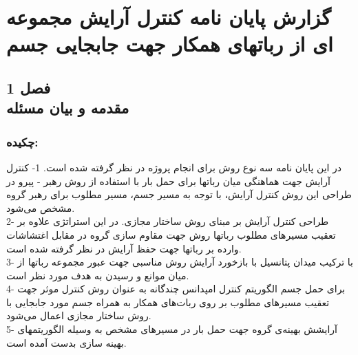 \chapter{گزارش پایان  نامه کنترل آرایش مجموعه ای از رباتهای همکار جهت جابجایی جسم}

\section{فصل 1
\\
مقدمه و بیان مسئله}
\subsection{چکیده:}
در این پایان نامه سه نوع روش برای انجام پروژه در نظر گرفته شده است.
1- کنترل آرایش جهت هماهنگی میان رباتها برای حمل بار با استفاده از روش رهبر - پیرو در طراحی این روش کنترل آرایش، با توجه به مسیر جسم، مسیر مطلوب برای رهبر گروه مشخص می‌شود.
\\
2- طراحی کنترل آرایش بر مبنای روش ساختار مجازی. در این استراتژی علاوه بر تعقیب مسیرهای مطلوب رباتها روش 
جهت مقاوم سازی گروه در مقابل اغتشاشات وارده بر رباتها جهت حفظ آرایش در نظر گرفته شده است.
\\
3- با ترکیب میدان پتانسیل با بازخورد آرایش روش مناسبی جهت عبور مجموعه رباتها از میان موانع و رسیدن به هدف مورد نظر است.
\\
4- برای حمل جسم الگوریتم کنترل امپدانس چندگانه به عنوان روش کنترل موثر جهت تعقیب مسیرهای مطلوب بر روی ربات‌های همکار به همراه جسم مورد جابجایی با روش ساختار مجازی اعمال می‌شود.
\\
5- آرایشش بهینه‌ی گروه جهت حمل بار در مسیرهای مشخص به وسیله الگوریتمهای بهینه سازی بدست آمده است.

